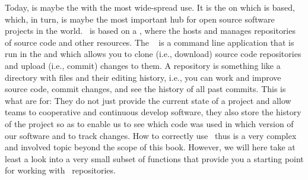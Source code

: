 %
%
Today, \git{} is maybe the  with the most wide-spread use.
It is the  on which \github{} is based, which, in turn, is maybe the most important hub for open source software projects in the world.
\git\ is based on a , where the  hosts and manages repositories of source code and other resources.
The \git\  is a command line application that is run in the  and which allows you to clone (i.e., download) source code repositories and upload (i.e., commit) changes to them.
A repository is something like a directory with files and their editing history, i.e., you can work and improve source code, commit changes, and see the history of all past commits.
This is what  are for:
They do not just provide the current state of a project and allow teams to cooperative and continuous develop software, they also store the history of the project so as to enable us to see which code was used in which version of our software and to track changes.
How to correctly use \git\ thus is a very complex and involved topic beyond the scope of this book.
However, we will here take at least a look into a very small subset of functions that provide you a starting point for working with \git\ repositories.%
%
%
%
\endhsection%
